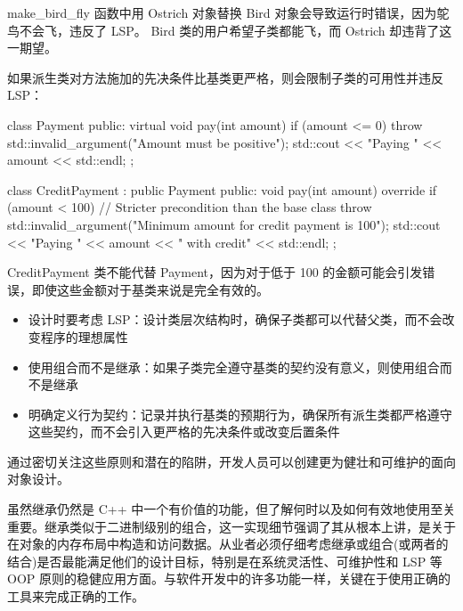 make\_bird\_fly 函数中用 Ostrich 对象替换 Bird 对象会导致运行时错误，因为鸵鸟不会飞，违反了 LSP。 Bird 类的用户希望子类都能飞，而 Ostrich 却违背了这一期望。


如果派生类对方法施加的先决条件比基类更严格，则会限制子类的可用性并违反 LSP：

\begin{cpp}
class Payment {
public:
    virtual void pay(int amount) {
        if (amount <= 0) {
            throw std::invalid_argument("Amount must be positive");
        }
        std::cout << "Paying " << amount << std::endl;
    }
};

class CreditPayment : public Payment {
public:
    void pay(int amount) override {
        if (amount < 100) { // Stricter precondition than the base
            class
            throw std::invalid_argument("Minimum amount for credit payment is 100");
        }
        std::cout << "Paying " << amount << " with credit" <<
        std::endl;
    }
};
\end{cpp}

CreditPayment 类不能代替 Payment，因为对于低于 100 的金额可能会引发错误，即使这些金额对于基类来说是完全有效的。


\begin{itemize}
\item
设计时要考虑 LSP：设计类层次结构时，确保子类都可以代替父类，而不会改变程序的理想属性

\item
使用组合而不是继承：如果子类完全遵守基类的契约没有意义，则使用组合而不是继承

\item
明确定义行为契约：记录并执行基类的预期行为，确保所有派生类都严格遵守这些契约，而不会引入更严格的先决条件或改变后置条件
\end{itemize}

通过密切关注这些原则和潜在的陷阱，开发人员可以创建更为健壮和可维护的面向对象设计。

虽然继承仍然是 C++ 中一个有价值的功能，但了解何时以及如何有效地使用至关重要。继承类似于二进制级别的组合，这一实现细节强调了其从根本上讲，是关于在对象的内存布局中构造和访问数据。从业者必须仔细考虑继承或组合(或两者的结合)是否最能满足他们的设计目标，特别是在系统灵活性、可维护性和 LSP 等 OOP 原则的稳健应用方面。与软件开发中的许多功能一样，关键在于使用正确的工具来完成正确的工作。
















